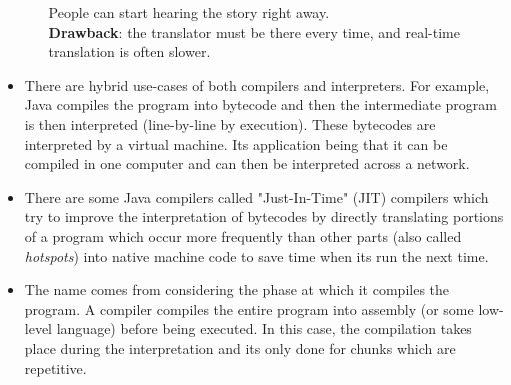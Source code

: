 \documentclass[hidelinks]{article}
\begin{document}
\begin{itemize}
\begin{itemize}
        People can start hearing the story right away. \\

        \textbf{Drawback}: the translator must be there every time, and real-time translation is often slower.
    \end{itemize}

    \item There are hybrid use-cases of both compilers and interpreters. For example, Java compiles the program into bytecode and then the intermediate program is then interpreted (line-by-line by execution). These bytecodes are interpreted by a virtual machine. Its application being that it can be compiled in one computer and can then be interpreted across a network.

    \item There are some Java compilers called "Just-In-Time" (JIT) compilers which try to improve the interpretation of bytecodes by directly translating portions of a program which occur more frequently than other parts (also called \textit{hotspots}) into native machine code to save time when its run the next time.

    \item The name comes from considering the phase at which it compiles the program. A compiler compiles the entire program into assembly (or some low-level language) before being executed. In this case, the compilation takes place during the interpretation and its only done for chunks which are repetitive.

\end{itemize}





\end{document}
